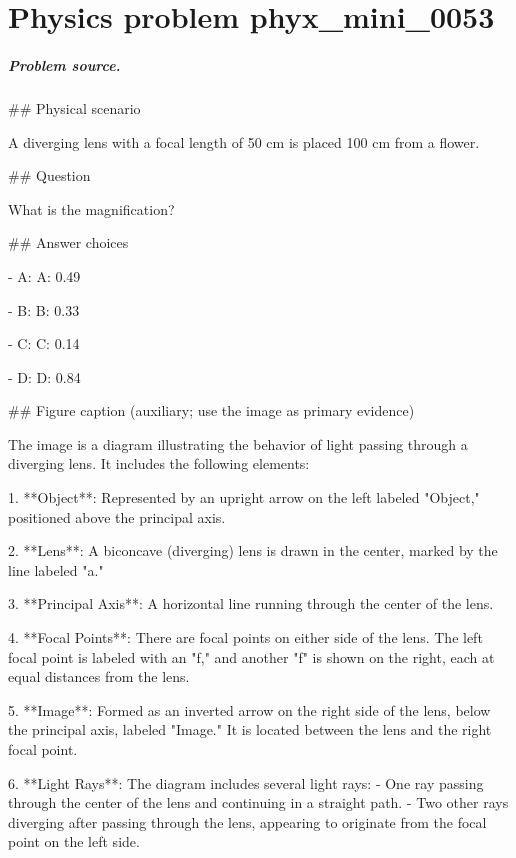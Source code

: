
\chapter{Physics problem phyx\_mini\_0053}
\label{ch:PhyXMiniProblems_problem_phyx_mini_0053}

\paragraph{Problem source.}
\#\# Physical scenario

A diverging lens with a focal length of 50 cm is placed 100 cm from a flower.

\#\# Question

What is the magnification?

\#\# Answer choices

- A: A: 0.49

- B: B: 0.33

- C: C: 0.14

- D: D: 0.84

\#\# Figure caption (auxiliary; use the image as primary evidence)

The image is a diagram illustrating the behavior of light passing through a diverging lens. It includes the following elements:

1. **Object**: Represented by an upright arrow on the left labeled "Object," positioned above the principal axis.

2. **Lens**: A biconcave (diverging) lens is drawn in the center, marked by the line labeled "a."

3. **Principal Axis**: A horizontal line running through the center of the lens.

4. **Focal Points**: There are focal points on either side of the lens. The left focal point is labeled with an "f," and another "f" is shown on the right, each at equal distances from the lens.

5. **Image**: Formed as an inverted arrow on the right side of the lens, below the principal axis, labeled "Image." It is located between the lens and the right focal point.

6. **Light Rays**: The diagram includes several light rays:
   - One ray passing through the center of the lens and continuing in a straight path.
   - Two other rays diverging after passing through the lens, appearing to originate from the focal point on the left side.

